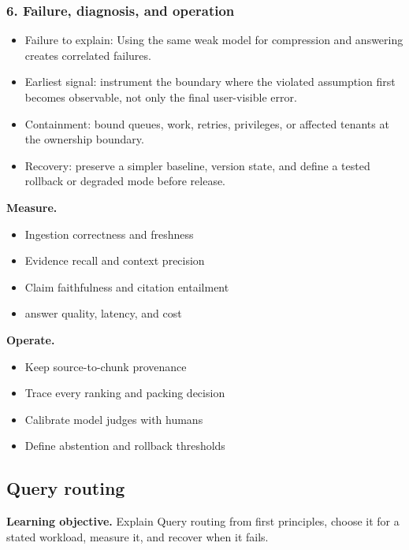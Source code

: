 \subsubsection*{6. Failure, diagnosis, and operation}
\begin{itemize}
\item Failure to explain: Using the same weak model for compression and answering creates correlated failures.
\item Earliest signal: instrument the boundary where the violated assumption first becomes observable, not only the final user-visible error.
\item Containment: bound queues, work, retries, privileges, or affected tenants at the ownership boundary.
\item Recovery: preserve a simpler baseline, version state, and define a tested rollback or degraded mode before release.
\end{itemize}
\textbf{Measure.}\begin{itemize}
\item Ingestion correctness and freshness
\item Evidence recall and context precision
\item Claim faithfulness and citation entailment
\item answer quality, latency, and cost
\end{itemize}
\textbf{Operate.}\begin{itemize}
\item Keep source-to-chunk provenance
\item Trace every ranking and packing decision
\item Calibrate model judges with humans
\item Define abstention and rollback thresholds
\end{itemize}
\subsection{Query routing}
\textbf{Learning objective.} Explain Query routing from first principles, choose it for a stated workload, measure it, and recover when it fails.
